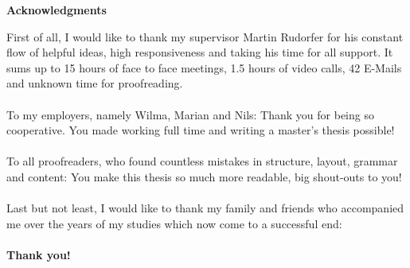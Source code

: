 \thispagestyle{empty}
\vspace*{1.0cm}

\begin{center}
    {\LARGE \textbf{Acknowledgments}}
\end{center}

\vspace*{0.5cm}

First of all, I would like to thank my supervisor Martin Rudorfer for his constant flow of helpful ideas, high responsiveness and taking his time for all support. It sums up to 15 hours of face to face meetings, 1.5 hours of video calls, 42 E-Mails and unknown time for proofreading.\\ \\
\noindent
To my employers, namely Wilma, Marian and Nils: Thank you for being so cooperative. You made working full time and writing a master's thesis possible!\\ \\
\noindent
To all proofreaders, who found countless mistakes in structure, layout, grammar and content: You make this thesis so much more readable, big shout-outs to you!\\ \\
\noindent
Last but not least, I would like to thank my family and friends who accompanied me over the years of my studies which now come to a successful end:\\ \\

\textbf{Thank you!}